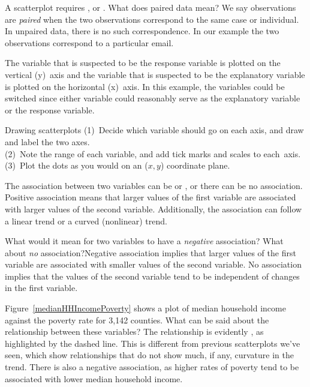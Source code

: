 \begin{examplewrap}
\begin{nexample}{A scatterplot requires , or . What does paired data mean?}
We say observations are \emph{paired} when the two observations correspond to the same case or individual. In unpaired data, there is no such correspondence. In our example the two observations correspond to a particular email.
\end{nexample}
\end{examplewrap}

The variable that is suspected to be the response variable is plotted on the vertical (y)~axis and the variable that is suspected to be the explanatory variable is plotted on the horizontal (x)~axis. In this example, the variables could be switched since either variable could reasonably serve as the explanatory variable or the response variable.

\begin{onebox}{Drawing scatterplots}
(1)~Decide which variable should go on each axis, and draw and label the two axes. \\
(2)~Note the range of each variable, and add tick marks and scales to each~axis. \\
(3)~Plot the dots as you would on an ($x, y$) coordinate plane.\end{onebox}

The association between two variables can be  or , or there can be no association. Positive association means that larger values of the first variable are associated with larger values of the second variable. Additionally, the association can follow a linear trend or a curved (nonlinear) trend.

\D{\newpage}

\begin{examplewrap}
\begin{nexample}
{What would it mean for two variables to have a \emph{negative} association? What about \emph{no} association?}Negative association implies that larger values of the first variable are associated with smaller values of the second variable. No association implies that the values of the second variable tend to be independent of changes in the first variable.
\end{nexample}
\end{examplewrap}

\begin{examplewrap}
\begin{nexample}{Figure~\ref{medianHHIncomePoverty}
    shows a plot of median household income
    against the poverty rate for 3,142 counties.
    What can be said about the relationship between
    these variables?}
  The relationship is evidently ,
  as highlighted by the dashed line.
  This is different from previous scatterplots we've seen,
  which show relationships that do not show much, if any,
  curvature in the trend.  There is also a negative association, as higher rates of poverty tend to be associated with lower median household income.
\end{nexample}
\end{examplewrap}


